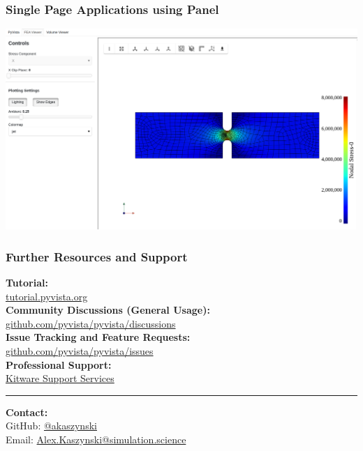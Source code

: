 \documentclass[t]{beamer}
\begin{document}
\begin{frame}

    \frametitle{Single Page Applications using Panel}

    \begin{center}
        \href{https://panel-example-production.up.railway.app/}{\includegraphics[width=\textwidth]{figures/panel-pyvista.png}}
    \end{center}

\end{frame}

\begin{frame}
    \frametitle{Further Resources and Support}

    \centering
    \textbf{Tutorial:} \\[5pt]
    \href{https://tutorial.pyvista.org/}{tutorial.pyvista.org} \\[10pt]

    \textbf{Community Discussions (General Usage):} \\[5pt]
    \href{https://github.com/pyvista/pyvista/discussions}{github.com/pyvista/pyvista/discussions} \\[10pt]

    \textbf{Issue Tracking and Feature Requests:} \\[5pt]
    \href{https://github.com/pyvista/pyvista/issues}{github.com/pyvista/pyvista/issues} \\[10pt]

    \textbf{Professional Support:} \\[5pt]
    \href{https://www.kitware.com/support/}{Kitware Support Services} \\[10pt]

    \rule{\textwidth}{0.5pt}

    \textbf{Contact:} \\[5pt]
    GitHub: \href{https://github.com/akaszynski}{@akaszynski} \\[5pt]
    Email: \href{mailto:Alex.Kaszynski@simulation.science}{Alex.Kaszynski@simulation.science} \\[10pt]

\end{frame}
\end{document}
